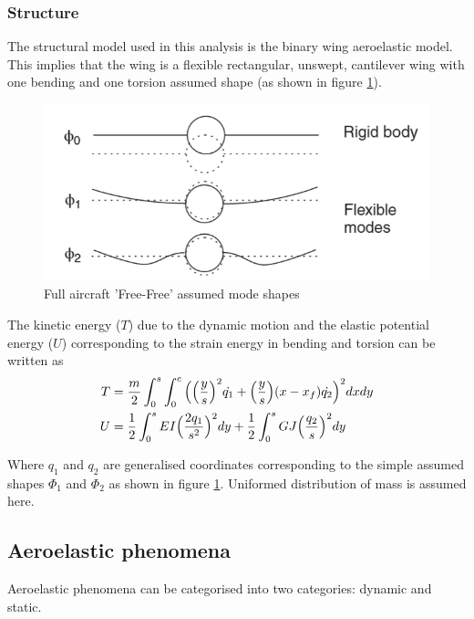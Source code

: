 \documentclass[11pt]{article}
\begin{document}
\subsubsection{Structure}
The structural model used in this analysis is the binary wing aeroelastic model. This implies that the wing is a flexible rectangular, unswept, cantilever wing with one bending and one torsion assumed shape (as shown in figure \ref{fig:free-free}).
\begin{figure}[H]
    \centering
    \includegraphics[width = .6\textwidth]{figures/free-free-mode-shape.png}
    \caption{Full aircraft 'Free-Free' assumed mode shapes}
    \label{fig:free-free}
\end{figure}
The kinetic energy ($T$) due to the dynamic motion and the elastic potential energy ($U$) corresponding to the strain energy in bending and torsion can be written as
\begin{align}
    T &= \frac{m}{2}\int_0^s \int_0^c \Big( \Big{(} \frac{y}{s}\Big{)}^2\dot{q_1}+\Big{(}\frac{y}{s}\Big{)}(x-x_f)\dot{q_2}\Big{)}^2dxdy\\
    U &= \frac{1}{2}\int_0^s EI \Big{(}\frac{2q_1}{s^2}\Big{)}^2dy+\frac{1}{2}\int_0^sGJ\Big{(}\frac{q_2}{s}\Big{)}^2dy
\end{align}

Where $q_1$ and $q_2$ are generalised coordinates corresponding to the simple assumed shapes $\Phi_1$ and $\Phi_2$ as shown in figure \ref{fig:free-free}. Uniformed distribution of mass is assumed here. 


\subsection{Aeroelastic phenomena}
Aeroelastic phenomena can be categorised into two categories: dynamic and static. 

\end{document}
